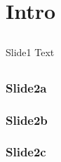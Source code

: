 \documentclass[pdf]{beamer}
\begin{document}
\section{Intro}

\subsection{}
\begin{frame}{Slide1}
    Text
\end{frame}

\subsection{}
\begin{frame}
    \frametitle<1>{Slide2a}
    \frametitle<2>{Slide2b}
    \frametitle<3>{Slide2c}
\end{frame}
\end{document}
